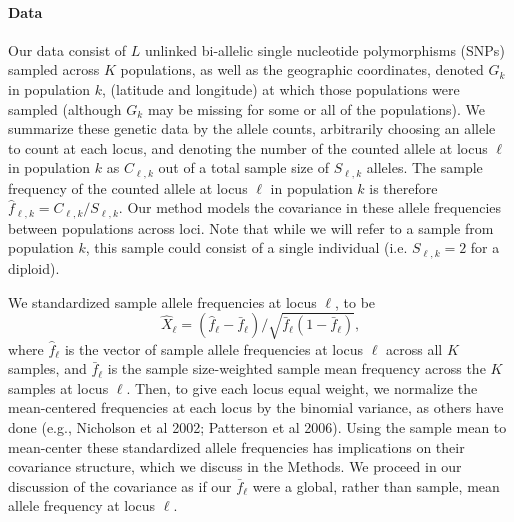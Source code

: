 \documentclass[12pt]{article}
\begin{document}
\paragraph{Data}

Our data consist of $L$ unlinked bi-allelic single nucleotide polymorphisms (SNPs) sampled across $K$ populations, as well as the geographic coordinates, denoted $G_k$ in population $k$, (latitude and longitude) at which those populations were sampled (although $G_k$ may be missing for some or all of the populations). We summarize these genetic data by the allele counts, arbitrarily choosing an allele to count at each locus, and denoting the number of the counted allele at locus $\ell$ in population $k$ as $C_{\ell,k}$ out of a total sample size of $S_{\ell,k}$ alleles.  The sample frequency of the counted allele at locus $\ell$ in population $k$ is therefore $\hat{f}_{\ell,k} = C_{\ell,k}/S_{\ell,k}$.  Our method models the covariance in these allele frequencies between populations across loci. Note that while we will refer to a sample from population $k$, this sample could consist of a single individual (i.e. $S_{\ell,k}=2$ for a diploid). 

We standardized sample allele frequencies at locus $\ell$, to be
\begin{equation}
  \label{eq:standardized_sample_freqs}
  \hat{X}_\ell = (\hat{f}_{\ell}  - \bar{f}_{\ell})/\sqrt{\bar{f}_{\ell}(1-\bar{f}_{\ell})}\text{,}
\end{equation}
where $\hat{f}_{\ell}$ is the vector of sample allele frequencies at locus $\ell$ across all $K$ samples, and $\bar{f}_{\ell}$ is the sample size-weighted sample mean frequency across the $K$ samples at locus $\ell$.  Then, to give each locus equal weight, we normalize the mean-centered frequencies at each locus by the binomial variance, as others have done (e.g., Nicholson et al 2002; Patterson et al 2006).  Using the sample mean to mean-center these standardized allele frequencies has implications on their covariance structure, which we discuss in the Methods.  We proceed in our discussion of the covariance as if our $\bar{f}_{\ell}$ were a global, rather than sample, mean allele frequency at locus $\ell$.
\end{document}
